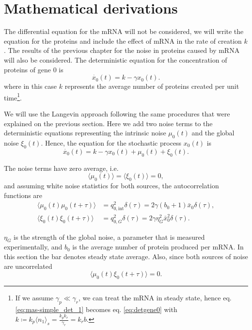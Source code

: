 \section{Mathematical derivations}

The differential equation for the mRNA will not be considered, we will write the equation for the proteins and include the effect of mRNA in the rate of creation $k$. The results of the previous chapter for the noise in proteins caused by mRNA will also be considered. The deterministic equation for the concentration of proteins of gene $0$ is 
\begin{equation}
\label{eq:detgene0}
\dot{x_0}(t) = k - \gamma x_0(t).
\end{equation}
where in this case $k$ represents the average number of proteins created per unit time\footnote{If we assume $\gamma_p\ll\gamma_r$, we can treat the mRNA in steady state, hence eq. \eqref{eq:mas-simple_det_1} becomes eq. \eqref{eq:detgene0} with $k \coloneqq k_p\langle n_1\rangle_s =  \frac{k_pk_r}{\gamma_r} = k_rb$.}.

We will use the Langevin approach following the same procedures that were explained on the previous section. Here we add two noise terms to the deterministic equations representing the intrinsic noise $\mu_0(t)$ and the global noise $\xi_0(t)$. Hence, the equation for the stochastic process $x_0(t)$ is
\begin{equation}
\label{eq:gene0}
\dot{x_0}(t) = k - \gamma x_0(t) + \mu_0(t) + \xi_0(t).
\end{equation}

The noise terms have zero average, i.e.
\begin{equation*}
\langle\mu_0(t)\rangle = \langle\xi_0(t)\rangle = 0,
\end{equation*}
and assuming white noise statistics for both sources, the autocorrelation functions are
\begin{align}
\langle\mu_0(t)\mu_0(t+\tau)\rangle&=q^2_{0,\text{int}}\delta(\tau)=2\gamma(b_0+1)\bar{x}_0\delta(\tau),\label{eq:corin0}\\
\langle\xi_0(t)\xi_0(t+\tau)\rangle&=q^2_{0,G}\delta(\tau)=2\gamma\eta_G^2\bar{x}_0^2\delta(\tau). \label{eq:corex0}
\end{align}

$\eta_G$ is the strength of the global noise, a parameter that is measured experimentally, and $b_0$ is the average number of protein produced per mRNA. In this section the bar denotes steady state average. Also, since both sources of noise are uncorrelated
\begin{equation}
\label{eq:corinex0}
\langle\mu_0(t)\xi_0(t+\tau)\rangle = 0.
\end{equation}

